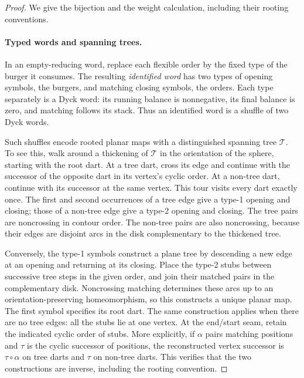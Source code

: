 \begin{proof}
We give the bijection and the weight calculation, including their rooting
conventions.

\paragraph{Typed words and spanning trees.}
In an empty-reducing word, replace each flexible order by the fixed type
of the burger it consumes. The resulting \emph{identified word} has two
types of opening symbols, the burgers, and matching closing symbols,
the orders. Each type separately is a Dyck word: its running balance is
nonnegative, its final balance is zero, and matching follows its stack.
Thus an identified word is a shuffle of two Dyck words.

Such shuffles encode rooted planar maps with a distinguished spanning
tree $\mathcal T$. To see this, walk around a thickening of $\mathcal T$
in the orientation of the sphere, starting with the root dart. At a tree
dart, cross its edge and continue with the successor of the opposite dart
in its vertex's cyclic order. At a non-tree dart, continue with its
successor at the same vertex. This tour visits every dart exactly once.
The first and second occurrences of a tree edge give a type-1 opening
and closing; those of a non-tree edge give a type-2 opening and closing.
The tree pairs are noncrossing in contour order. The non-tree pairs are
also noncrossing, because their edges are disjoint arcs in the disk
complementary to the thickened tree.

Conversely, the type-1 symbols construct a plane tree by descending a new
edge at an opening and returning at its closing. Place the type-2 stubs
between successive tree steps in the given order, and join their matched
pairs in the complementary disk. Noncrossing matching determines these
arcs up to an orientation-preserving homeomorphism, so this constructs a
unique planar map. The first symbol specifies its root dart. The same
construction applies when there are no tree edges: all the stubs lie at
one vertex. At the end/start seam, retain the indicated cyclic order of
stubs. More explicitly, if $\alpha$ pairs matching positions and $\tau$
is the cyclic successor of positions, the reconstructed vertex successor
is $\tau\circ\alpha$ on tree darts and $\tau$ on non-tree darts.
This verifies that the two constructions are inverse, including the
rooting convention.


\end{proof}
